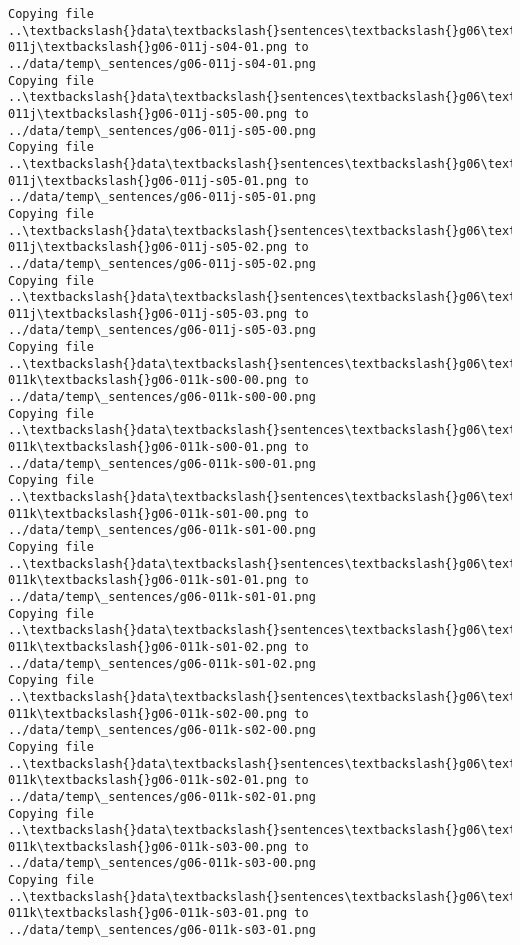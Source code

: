 \documentclass[11pt]{article}
\begin{document}
\begin{Verbatim}[commandchars=\\\{\}]
Copying file ..\textbackslash{}data\textbackslash{}sentences\textbackslash{}g06\textbackslash{}g06-011j\textbackslash{}g06-011j-s04-01.png to
../data/temp\_sentences/g06-011j-s04-01.png
Copying file ..\textbackslash{}data\textbackslash{}sentences\textbackslash{}g06\textbackslash{}g06-011j\textbackslash{}g06-011j-s05-00.png to
../data/temp\_sentences/g06-011j-s05-00.png
Copying file ..\textbackslash{}data\textbackslash{}sentences\textbackslash{}g06\textbackslash{}g06-011j\textbackslash{}g06-011j-s05-01.png to
../data/temp\_sentences/g06-011j-s05-01.png
Copying file ..\textbackslash{}data\textbackslash{}sentences\textbackslash{}g06\textbackslash{}g06-011j\textbackslash{}g06-011j-s05-02.png to
../data/temp\_sentences/g06-011j-s05-02.png
Copying file ..\textbackslash{}data\textbackslash{}sentences\textbackslash{}g06\textbackslash{}g06-011j\textbackslash{}g06-011j-s05-03.png to
../data/temp\_sentences/g06-011j-s05-03.png
Copying file ..\textbackslash{}data\textbackslash{}sentences\textbackslash{}g06\textbackslash{}g06-011k\textbackslash{}g06-011k-s00-00.png to
../data/temp\_sentences/g06-011k-s00-00.png
Copying file ..\textbackslash{}data\textbackslash{}sentences\textbackslash{}g06\textbackslash{}g06-011k\textbackslash{}g06-011k-s00-01.png to
../data/temp\_sentences/g06-011k-s00-01.png
Copying file ..\textbackslash{}data\textbackslash{}sentences\textbackslash{}g06\textbackslash{}g06-011k\textbackslash{}g06-011k-s01-00.png to
../data/temp\_sentences/g06-011k-s01-00.png
Copying file ..\textbackslash{}data\textbackslash{}sentences\textbackslash{}g06\textbackslash{}g06-011k\textbackslash{}g06-011k-s01-01.png to
../data/temp\_sentences/g06-011k-s01-01.png
Copying file ..\textbackslash{}data\textbackslash{}sentences\textbackslash{}g06\textbackslash{}g06-011k\textbackslash{}g06-011k-s01-02.png to
../data/temp\_sentences/g06-011k-s01-02.png
Copying file ..\textbackslash{}data\textbackslash{}sentences\textbackslash{}g06\textbackslash{}g06-011k\textbackslash{}g06-011k-s02-00.png to
../data/temp\_sentences/g06-011k-s02-00.png
Copying file ..\textbackslash{}data\textbackslash{}sentences\textbackslash{}g06\textbackslash{}g06-011k\textbackslash{}g06-011k-s02-01.png to
../data/temp\_sentences/g06-011k-s02-01.png
Copying file ..\textbackslash{}data\textbackslash{}sentences\textbackslash{}g06\textbackslash{}g06-011k\textbackslash{}g06-011k-s03-00.png to
../data/temp\_sentences/g06-011k-s03-00.png
Copying file ..\textbackslash{}data\textbackslash{}sentences\textbackslash{}g06\textbackslash{}g06-011k\textbackslash{}g06-011k-s03-01.png to
../data/temp\_sentences/g06-011k-s03-01.png

\end{Verbatim}
\end{document}
